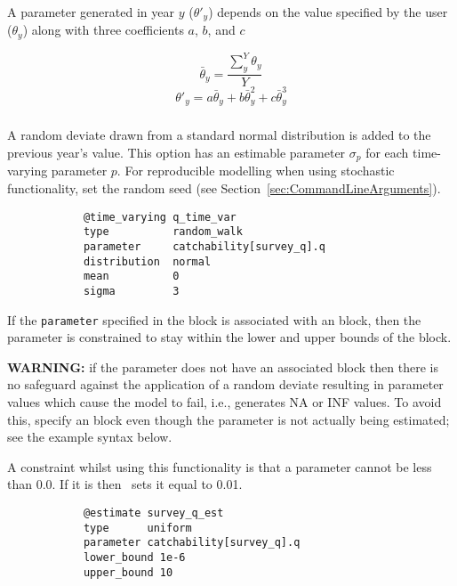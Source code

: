 A parameter generated in year $y$ ($\theta'_y$) depends on the value specified by the user ($\theta_y$) along with three coefficients $a$, $b$, and $c$

\begin{equation}
	\bar{\theta}_y = \frac{\sum_{y}^Y\theta_y}{Y}
\end{equation}
\begin{equation}
	\theta'_y = a \bar{\theta}_y + b\bar{\theta}_y^{2} + c\bar{\theta}_y^{3}
\end{equation}

\subsubsection[Random Walk]{}\label{sec:TimeVarying-RandomWalk}

A random deviate drawn from a standard normal distribution is added to the previous year's value. This option has an estimable parameter $\sigma_p$ for each time-varying parameter $p$. For reproducible modelling when using stochastic functionality, set the random seed (see Section~\ref{sec:CommandLineArguments}).

{\small{\begin{verbatim}
			@time_varying q_time_var
			type          random_walk
			parameter     catchability[survey_q].q
			distribution  normal
			mean          0
			sigma         3
\end{verbatim}}}

If the \texttt{parameter} specified in the  block is associated with an  block, then the parameter is constrained to stay within the lower and upper bounds of the  block.

\textbf{WARNING:} if the parameter does not have an associated  block then there is no safeguard against the application of a random deviate resulting in parameter values which cause the model to fail, i.e., generates NA or INF values. To avoid this, specify an  block even though the parameter is not actually being estimated; see the example syntax below.

A constraint whilst using this functionality is that a parameter cannot be less than 0.0. If it is then \CNAME\ sets it equal to 0.01.

{\small{\begin{verbatim}
			@estimate survey_q_est
			type      uniform
			parameter catchability[survey_q].q
			lower_bound 1e-6
			upper_bound 10
\end{verbatim}}}

